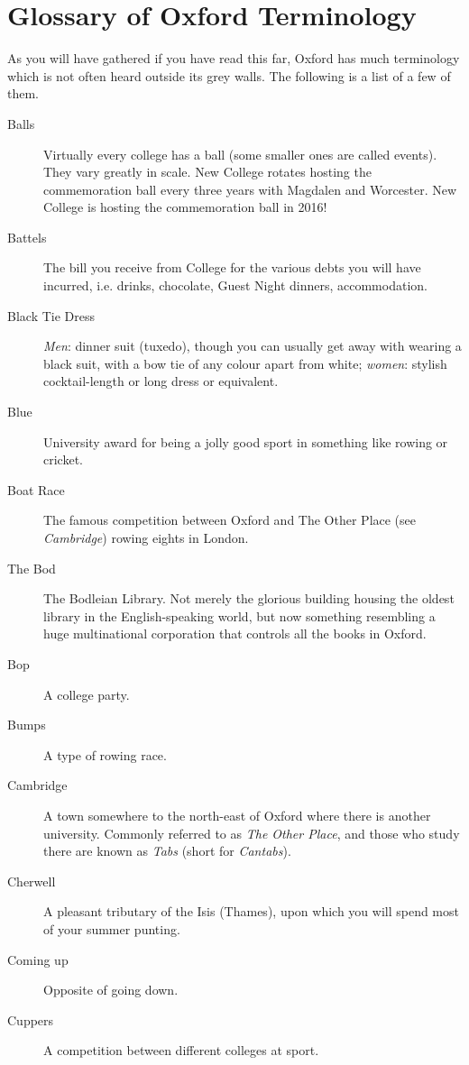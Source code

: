 
\chapter{Glossary of Oxford Terminology}

As you will have gathered if you have read this far, Oxford has much terminology which is not often heard outside its grey walls. The following is a list of a few of them.

\begin{description}
\item[Balls] Virtually every college has a ball (some smaller ones are called events). They vary greatly in scale. New College rotates hosting the commemoration ball every three years with Magdalen and Worcester. New College is hosting the commemoration ball in 2016!
\item[Battels] The bill you receive from College for the various debts you will
have incurred, i.e. drinks, chocolate, Guest Night dinners, accommodation.
\item[Black Tie Dress] \emph{Men}: dinner suit (tuxedo), though you can usually
get away with wearing a black suit, with a bow tie of any colour apart from
white; \emph{women}: stylish cocktail-length or long dress or equivalent.
\item[Blue] University award for being a jolly good sport in something like
rowing or cricket.
\item[Boat Race] The famous competition between Oxford and The Other Place (see
\emph{Cambridge}) rowing eights in London.
\item[The Bod] The Bodleian Library. Not merely the glorious building housing
the oldest library in the English-speaking world, but now something resembling a huge multinational corporation that controls all the books in Oxford.
\item[Bop] A college party.
\item[Bumps] A type of rowing race.
\item[Cambridge] A town somewhere to the north-east of Oxford where there is
another university. Commonly referred to as \emph{The Other Place}, and those
who study there are known as \emph{Tabs} (short for \emph{Cantabs}).
\item[Cherwell] A pleasant tributary of the Isis (Thames), upon which you will
spend most of your summer punting.
\item[Coming up] Opposite of going down.
\item[Cuppers] A competition between different colleges at sport.

\end{description}
